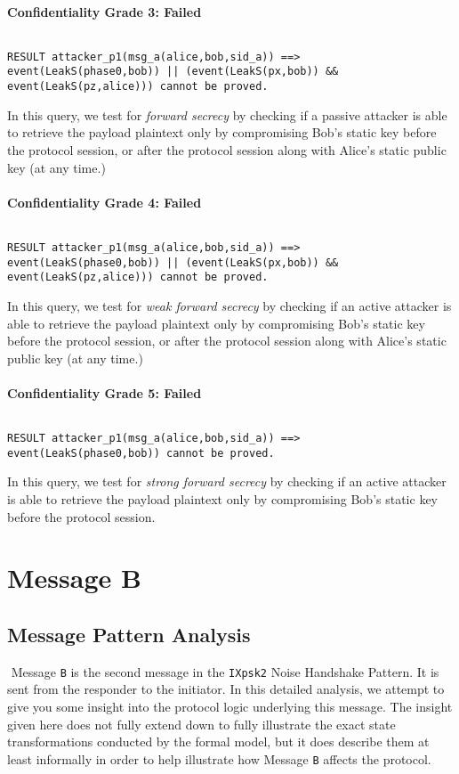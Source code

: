 \paragraph{Confidentiality Grade 3: Failed}$ $
\begin{lstlisting}
RESULT attacker_p1(msg_a(alice,bob,sid_a)) ==> event(LeakS(phase0,bob)) || (event(LeakS(px,bob)) && event(LeakS(pz,alice))) cannot be proved.
\end{lstlisting}

In this query, we test for \emph{forward secrecy} by checking if a passive attacker is able to retrieve the payload plaintext only by compromising Bob's static key before the protocol session, or after the protocol session along with Alice's static public key (at any time.)


\paragraph{Confidentiality Grade 4: Failed}$ $
\begin{lstlisting}
RESULT attacker_p1(msg_a(alice,bob,sid_a)) ==> event(LeakS(phase0,bob)) || (event(LeakS(px,bob)) && event(LeakS(pz,alice))) cannot be proved.
\end{lstlisting}

In this query, we test for \emph{weak forward secrecy} by checking if an active attacker is able to retrieve the payload plaintext only by compromising Bob's static key before the protocol session, or after the protocol session along with Alice's static public key (at any time.)


\paragraph{Confidentiality Grade 5: Failed}$ $
\begin{lstlisting}
RESULT attacker_p1(msg_a(alice,bob,sid_a)) ==> event(LeakS(phase0,bob)) cannot be proved.
\end{lstlisting}

In this query, we test for \emph{strong forward secrecy} by checking if an active attacker is able to retrieve the payload plaintext only by compromising Bob's static key before the protocol session.


\section{ Message B}

\subsection{Message Pattern Analysis}$ $
Message \texttt{B} is the second message in the \texttt{IXpsk2} Noise Handshake Pattern. It is sent from the responder to the initiator. In this detailed analysis, we attempt to give you some insight into the protocol logic underlying this message. The insight given here does not fully extend down to fully illustrate the exact state transformations conducted by the formal model, but it does describe them at least informally in order to help illustrate how Message \texttt{B} affects the protocol.


